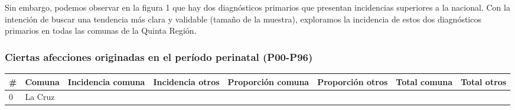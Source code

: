 \documentclass[]{article}
\begin{document}
Sin embargo, podemos observar en la figura 1 que hay dos diagnósticos
primarios que presentan incidencias superiores a la nacional. Con la
intención de buscar una tendencia más clara y validable (tamaño de la
muestra), exploramos la incidencia de estos dos diagnósticos primarios
en todas las comunas de la Quinta Región.

\hypertarget{ciertas-afecciones-originadas-en-el-peruxedodo-perinatal-p00-p96}{%
\subsubsection{Ciertas afecciones originadas en el período perinatal
(P00-P96)}\label{ciertas-afecciones-originadas-en-el-peruxedodo-perinatal-p00-p96}}

\begin{longtable}[]{@{}llllllll@{}}
\toprule
\begin{minipage}[b]{0.03\columnwidth}\raggedright
\#\strut
\end{minipage} & \begin{minipage}[b]{0.09\columnwidth}\raggedright
Comuna\strut
\end{minipage} & \begin{minipage}[b]{0.14\columnwidth}\raggedright
Incidencia comuna\strut
\end{minipage} & \begin{minipage}[b]{0.13\columnwidth}\raggedright
Incidencia otros\strut
\end{minipage} & \begin{minipage}[b]{0.10\columnwidth}\raggedright
Proporción comuna\strut
\end{minipage} & \begin{minipage}[b]{0.09\columnwidth}\raggedright
Proporción otros\strut
\end{minipage} & \begin{minipage}[b]{0.11\columnwidth}\raggedright
Total comuna\strut
\end{minipage} & \begin{minipage}[b]{0.10\columnwidth}\raggedright
Total otros\strut
\end{minipage}\tabularnewline
\midrule
\endhead
\begin{minipage}[t]{0.03\columnwidth}\raggedright
0\strut
\end{minipage} & \begin{minipage}[t]{0.09\columnwidth}\raggedright
La Cruz\strut
\end{minipage} & \begin{minipage}[t]{0.14\columnwidth}\raggedright

\end{minipage}
\end{longtable}
\end{document}
